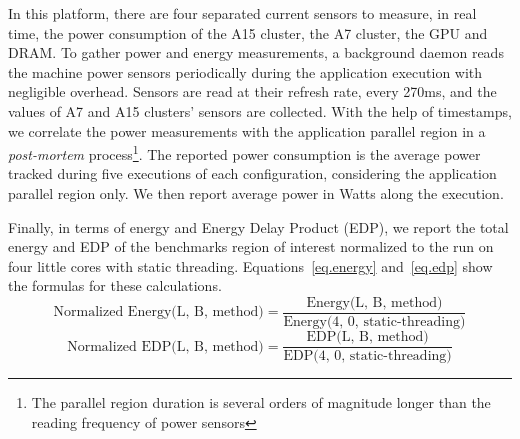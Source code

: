 
In this platform, there are four separated current sensors to measure, in real time, the power consumption of the A15 cluster, the A7 cluster, the GPU and DRAM. 
To gather power and energy measurements, a background daemon reads the machine power 
sensors periodically during the application execution with negligible overhead. Sensors are read 
at their refresh rate, every 270ms, and the values of A7 and A15 clusters' sensors are collected.
With the help of timestamps, we 
correlate the power measurements with the application parallel region in a  
\emph{post-mortem} process\footnote{The parallel region duration is several orders of magnitude longer than the reading frequency of power sensors}. 
The reported power consumption is the average power tracked during five executions of each configuration, considering the application parallel region only. 
We then report average power in Watts along the execution. 

Finally, in terms of energy and Energy Delay Product (EDP), we report the total energy and EDP of 
the benchmarks region of interest normalized to the run on four 
little cores with static threading.
Equations~\ref{eq.energy} and~\ref{eq.edp} show the formulas for these calculations.
\begingroup\makeatletter\def\f@size{8}\check@mathfonts
\begin{equation}
  \text{Normalized Energy(L, B, method)} = \frac{\text{Energy(L, B, method)}}{\text{Energy(4, 0, static-threading)}}
  \label{eq.energy}
\end{equation}
\begin{equation}
  \text{Normalized EDP(L, B, method)} = \frac{\text{EDP(L, B, method)}}{\text{EDP(4, 0, static-threading)}}
  \label{eq.edp}
\end{equation}
\endgroup




%

